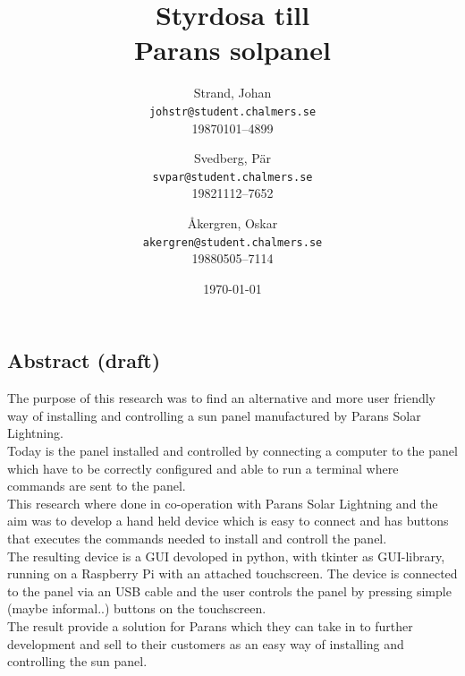 \documentclass{article}
\author{    Strand, Johan \\ \texttt{johstr@student.chalmers.se} \\ 
            19870101--4899 \and
            Svedberg, Pär\\ \texttt{svpar@student.chalmers.se}  \\ 
            19821112--7652 \and
            Åkergren, Oskar\\ \texttt{akergren@student.chalmers.se}  \\ 19880505--7114
}
\title{\vspace{2cm} Styrdosa till \\ Parans solpanel  \vspace{1cm}}
\date{\vspace{8cm}\today}
\begin{document}
    \maketitle
    \thispagestyle{empty}

    \newpage 
    \subsection*{Abstract (draft)} %
    \label{sub:abstract}
            The purpose of this research was to find an alternative and more user friendly way of installing and controlling a sun panel manufactured by Parans Solar Lightning. \\

            \noindent Today is the panel installed and controlled by connecting a computer to the panel which have to be correctly configured and able to run a terminal where commands are sent to the panel.\\

            \noindent This research where done in co-operation with Parans Solar Lightning and the aim was to develop a hand held device which is easy to connect and has buttons that executes the commands needed to install and controll the panel.\\

            \noindent The resulting device is a GUI devoloped in python, with tkinter as GUI-library, running on a Raspberry Pi with an attached touchscreen. The device is connected to the panel via an USB cable and the user controls the panel by pressing simple (maybe informal..) buttons on the touchscreen.\\

            \noindent The result provide a solution for Parans which they can take in to further development and sell to their customers as an easy way of installing and controlling the sun panel.

    \newpage 
\end{document}
